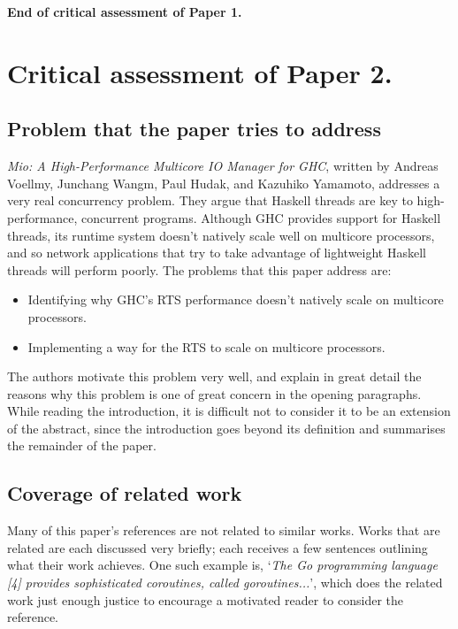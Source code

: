 \documentclass[9pt]{report}
\begin{document}
\noindent
{\bf End of critical assessment of Paper 1.}
\clearpage

\section*{Critical assessment of Paper 2.}
\subsection*{Problem that the paper tries to address}
{\it Mio: A High-Performance Multicore IO Manager for GHC}, written by Andreas Voellmy, Junchang Wangm, Paul Hudak, and Kazuhiko Yamamoto, addresses a very real concurrency problem.
They argue that Haskell threads are key to high-performance, concurrent programs.
Although GHC provides support for Haskell threads, its runtime system doesn't natively scale well on multicore processors, and so network applications that try to take advantage of lightweight Haskell threads will perform poorly.
The problems that this paper address are:

\begin{itemize}
\item Identifying why GHC's RTS performance doesn't natively scale on multicore processors.
\item Implementing a way for the RTS to scale on multicore processors.
\end{itemize}

\noindent
The authors motivate this problem very well, and explain in great detail the reasons why this problem is one of great concern in the opening paragraphs.
While reading the introduction, it is difficult not to consider it to be an extension of the abstract, since the introduction goes beyond its definition and summarises the remainder of the paper.\\

\subsection*{Coverage of related work}
Many of this paper's references are not related to similar works.
Works that are related are each discussed very briefly; each receives a few sentences outlining what their work achieves.
One such example is, `{\it The Go programming language [4] provides sophisticated coroutines, called goroutines...}', which does the related work just enough justice to encourage a motivated reader to consider the reference.\\
\end{document}
